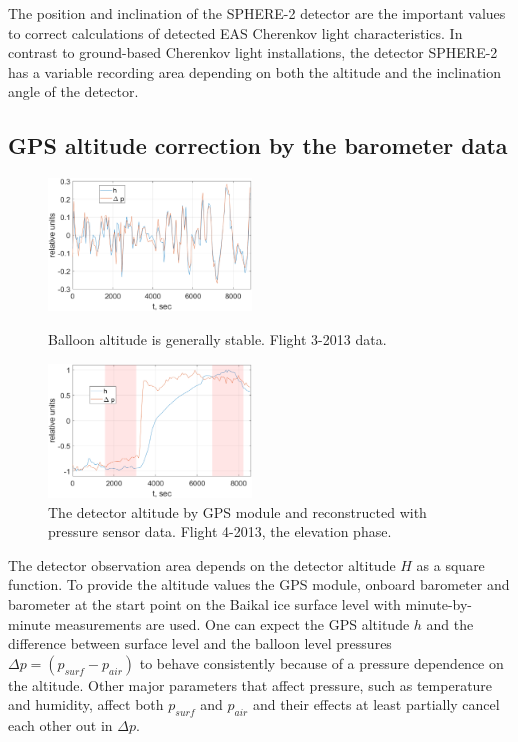 \documentclass[final,5p,times,twocolumn]{elsarticle}
\begin{document}
The position and inclination of the SPHERE-2 detector are the important values to correct calculations of detected EAS Cherenkov light characteristics. In contrast to ground-based Cherenkov light installations, the detector SPHERE-2 has a variable recording area depending on both the altitude and the inclination angle of the detector.


\subsection{GPS altitude correction by the barometer data}


\begin{figure}[t]
    \includegraphics[width=0.48\textwidth]{figs/good_corr.eps}
    \caption{Balloon altitude is generally stable. Flight 3-2013 data.}
    \label{fig:dp-h-good}
    \vspace{1pc}

    \includegraphics[width=0.48\textwidth]{figs/bad_corr.eps}
    \caption{The detector altitude by GPS module and reconstructed with pressure sensor data. Flight 4-2013, the elevation phase.}
    \label{fig:dp-h-bad}
\end{figure}


The detector observation area depends on the detector altitude $H$ as a square function. To provide the altitude values the GPS module, onboard barometer and barometer at the start point on the Baikal ice surface level with minute-by-minute measurements are used. One can expect the GPS altitude $h$ and the difference between surface level and the balloon level pressures $\Delta p = (p_{surf} - p_{air})$ to behave consistently because of a pressure dependence on the altitude. Other major parameters that affect pressure, such as temperature and humidity, affect both $p_{surf}$ and $p_{air}$ and their effects at least partially cancel each other out in $\Delta p$.
\end{document}
